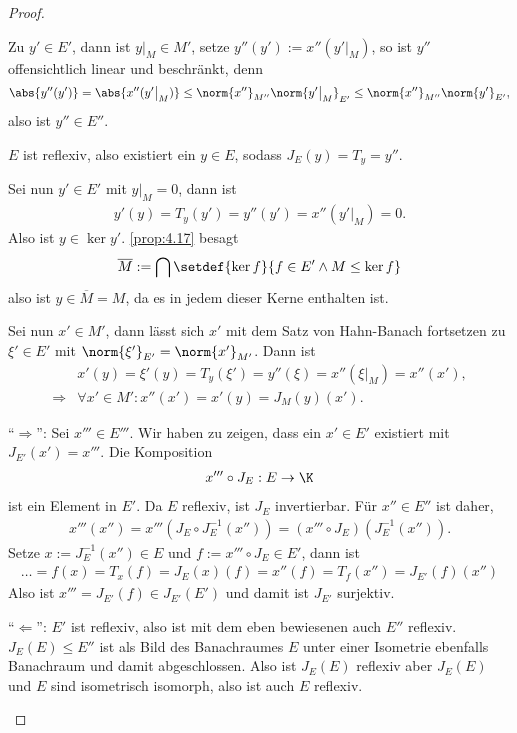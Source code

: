 \begin{proof}
\begin{proofenum}
Zu $y'\in E'$, dann ist $y\big|_M \in M'$, setze $y''(y') := x''(y'\big|_M)$,
so ist $y''$ offensichtlich linear und beschränkt, denn
\begin{align*}
\abs{y''(y')} = \abs{x''(y'\big|_M)} \le \norm{x''}_{M''}\norm{y'\big|_M}_{E'}
\le \norm{x''}_{M''}\norm{y'}_{E'},
\end{align*}
also ist $y''\in E''$.

$E$ ist reflexiv, also existiert ein $y\in E$, sodass
$J_E(y) = T_y = y''$.

Sei nun $y'\in E'$ mit $y\big|_M=0$, dann ist
\begin{align*}
y'(y) = T_y(y') = y''(y') = x''(y'\big|_M) = 0.
\end{align*}
Also ist $y\in \ker y'$. \ref{prop:4.17} besagt
\begin{align*}
\overline{M} := \bigcap\setdef{\ker f}{f\in E'\land M\le \ker f}
\end{align*}
also ist $y\in \overline{M}=M$, da es in jedem dieser Kerne enthalten ist.

Sei nun $x'\in M'$, dann lässt sich $x'$ mit dem Satz von Hahn-Banach
fortsetzen zu $\xi'\in E'$ mit $\norm{\xi'}_{E'}=\norm{x'}_{M'}$. Dann ist
\begin{align*}
&x'(y) = \xi'(y) = T_y(\xi') = y''(\xi) = x''(\xi\big|_M) = x''(x'),\\
\Rightarrow & 
\forall x'\in M' : x''(x')=x'(y) = J_M(y)(x').
\end{align*}
\item
``$\Rightarrow$'': Sei $x'''\in E'''$. Wir haben zu zeigen, dass ein $x'\in E'$
existiert mit $J_{E'}(x') = x'''$. Die Komposition
\begin{align*}
x'''\circ J_{E} : E\to\K 
\end{align*}
ist ein Element in $E'$. Da $E$ reflexiv, ist $J_E$ invertierbar. Für $x''\in
E''$ ist daher,
\begin{align*}
x'''(x'') = x'''(J_E\circ J_E^{-1}(x''))
= \left(x'''\circ J_E\right)( J_E^{-1}(x'')).
\end{align*}
Setze $x:= J_E^{-1}(x'')\in E$ und $f:=x'''\circ J_E\in E'$, dann ist
\begin{align*}
\ldots = f(x)
= T_x(f) = J_{E}(x)(f) = x''(f) = T_{f}(x'') = J_{E'}(f)(x'')
\end{align*}
Also ist $x'''=J_{E'}(f)\in J_{E'}(E')$ und damit ist $J_{E'}$ surjektiv.

``$\Leftarrow$'': $E'$ ist reflexiv, also ist mit dem eben bewiesenen auch
$E''$ reflexiv. $J_E(E)\le E''$ ist als Bild des Banachraumes $E$ unter einer
Isometrie ebenfalls Banachraum und damit abgeschlossen. Also ist $J_E(E)$
reflexiv aber $J_E(E)$ und $E$ sind isometrisch isomorph, also ist auch $E$
reflexiv.\qedhere
\end{proofenum}
\end{proof}

